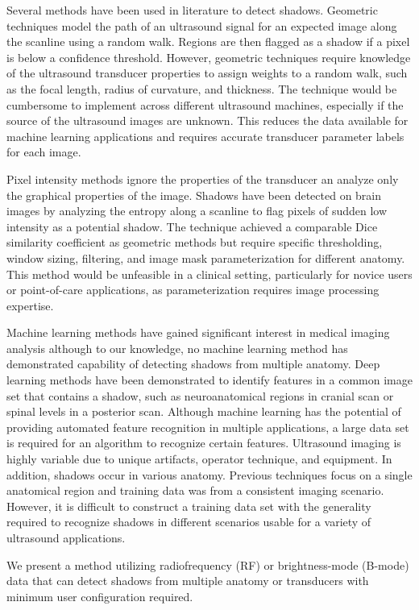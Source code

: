 \documentclass[preprint,5p]{elsarticle}
\begin{document}
Several methods have been used in literature to detect shadows. Geometric techniques model the path of an ultrasound signal for an expected image along the scanline using a random walk. Regions are then flagged as a shadow if a pixel is below a confidence threshold. However, geometric techniques require knowledge of the ultrasound transducer properties to assign weights to a random walk, such as the focal length, radius of curvature, and thickness. The technique would be cumbersome to implement across different ultrasound machines, especially if the source of the ultrasound images are unknown. This reduces the data available for machine learning applications and requires accurate transducer parameter labels for each image.

Pixel intensity methods ignore the properties of the transducer an analyze only the graphical properties of the image. Shadows have been detected on brain images by analyzing the entropy along a scanline to flag pixels of sudden low intensity as a potential shadow. The technique achieved a comparable Dice similarity coefficient as geometric methods but require specific thresholding, window sizing, filtering, and image mask parameterization for different anatomy. This method would be unfeasible in a clinical setting, particularly for novice users or point-of-care applications, as parameterization requires image processing expertise.

Machine learning methods have gained significant interest in medical imaging analysis although to our knowledge, no machine learning method has demonstrated capability of detecting shadows from multiple anatomy. Deep learning methods have been demonstrated to identify features in a common image set that contains a shadow, such as neuroanatomical regions in cranial scan or spinal levels in a posterior scan. Although machine learning has the potential of providing automated feature recognition in multiple applications, a large data set is required for an algorithm to recognize certain features. Ultrasound imaging is highly variable due to unique artifacts, operator technique, and equipment. In addition, shadows occur in various anatomy. Previous techniques focus on a single anatomical region and training data was from a consistent imaging scenario. However, it is difficult to construct a training data set with the generality required to recognize shadows in different scenarios usable for a variety of ultrasound applications.

We present a method utilizing radiofrequency (RF) or brightness-mode (B-mode) data that can detect shadows from multiple anatomy or transducers with minimum user configuration required. 
\end{document}
